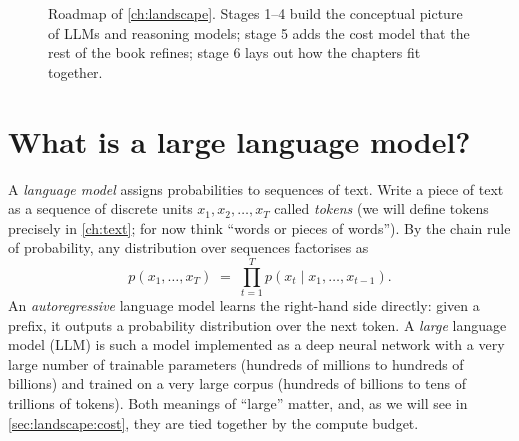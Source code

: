 \begin{figure}[t]
\centering
{}
\caption{Roadmap of \cref{ch:landscape}. Stages 1--4 build the conceptual picture of LLMs and
reasoning models; stage 5 adds the cost model that the rest of the book refines; stage 6 lays out how
the chapters fit together.}
\label{fig:landscape:roadmap}
\end{figure}

\section{What is a large language model?}\label{sec:landscape:what}

A \emph{language model} assigns probabilities to sequences of text. Write a piece of text as a sequence
of discrete units $x_1, x_2, \dots, x_T$ called \emph{tokens} (we will define tokens precisely in
\cref{ch:text}; for now think ``words or pieces of words''). By the chain rule of probability, any
distribution over sequences factorises as
\begin{equation}
p(x_1,\dots,x_T) \;=\; \prod_{t=1}^{T} p(x_t \mid x_1,\dots,x_{t-1}).
\label{eq:landscape:chain}
\end{equation}
An \emph{autoregressive} language model learns the right-hand side directly: given a prefix, it outputs a
probability distribution over the next token. A \emph{large} language model (LLM) is such a model
implemented as a deep neural network with a very large number of trainable parameters (hundreds of
millions to hundreds of billions) and trained on a very large corpus (hundreds of billions to tens of
trillions of tokens). Both meanings of ``large'' matter, and, as we will see in \cref{sec:landscape:cost},
they are tied together by the compute budget.

